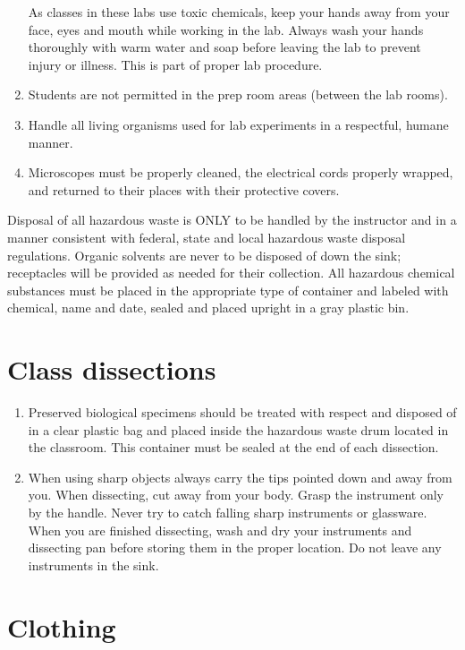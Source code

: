 \documentclass[]{book}
\providecommand{\tightlist}{%
  \setlength{\itemsep}{0pt}\setlength{\parskip}{0pt}}
\begin{document}
\begin{enumerate}
  As classes in these labs use toxic chemicals, keep your hands away from your face, eyes and mouth while working in the lab. Always wash your hands thoroughly with warm water and soap before leaving the lab to prevent injury or illness. This is part of proper lab procedure.
\item
  Students are not permitted in the prep room areas (between the lab rooms).
\item
  Handle all living organisms used for lab experiments in a respectful, humane manner.
\item
  Microscopes must be properly cleaned, the electrical cords properly wrapped, and returned to their places with their protective covers.
\end{enumerate}

Disposal of all hazardous waste is ONLY to be handled by the instructor and in a manner consistent with federal, state and local hazardous waste disposal regulations. Organic solvents are never to be disposed of down the sink; receptacles will be provided as needed for their collection. All hazardous chemical substances must be placed in the appropriate type of container and labeled with chemical, name and date, sealed and placed upright in a gray plastic bin.

\hypertarget{class-dissections}{%
\section{Class dissections}\label{class-dissections}}

\begin{enumerate}
\def\labelenumi{\arabic{enumi}.}
\setcounter{enumi}{13}
\tightlist
\item
  Preserved biological specimens should be treated with respect and disposed of in a clear plastic bag and placed inside the hazardous waste drum located in the classroom. This container must be sealed at the end of each dissection.
\item
  When using sharp objects always carry the tips pointed down and away from you. When dissecting, cut away from your body. Grasp the instrument only by the handle. Never try to catch falling sharp instruments or glassware. When you are finished dissecting, wash and dry your instruments and dissecting pan before storing them in the proper location. Do not leave any instruments in the sink.
\end{enumerate}

\hypertarget{clothing}{%
\section{Clothing}\label{clothing}}
\end{document}
